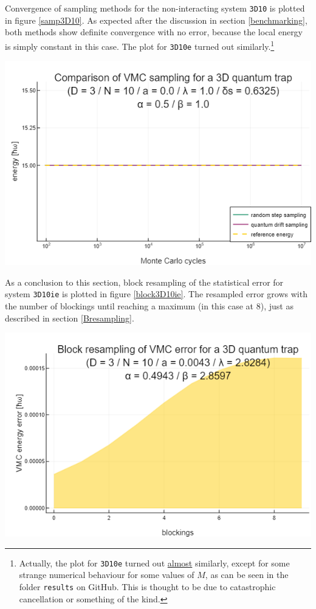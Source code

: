 \documentclass[a4paper,8pt]{article}
\begin{document}
\begin{multicols}{2}
Convergence of sampling methods for the non-interacting system \texttt{3D10} is plotted in figure \ref{samp3D10}. As expected after the discussion in section \ref{benchmarking}, both methods show definite convergence with no error, because the local energy is simply constant in this case. The plot for \texttt{3D10e} turned out similarly.\footnote{Actually, the plot for \texttt{3D10e} turned out \underline{almost} similarly, except for some strange numerical behaviour for some values of $M$, as can be seen in the folder \texttt{results} on GitHub. This is thought to be due to catastrophic cancellation or something of the kind.} 

\begin{center}
\includegraphics[width=0.9\columnwidth]{fig3D10_sampling}
\label{samp3D10}
\end{center}

As a conclusion to this section, block resampling of the statistical error for system \texttt{3D10ie} is plotted in figure \ref{block3D10ie}. The resampled error grows with the number of blockings until reaching a maximum (in this case at 8), just as described in section \ref{Bresampling}.

\begin{center}
\includegraphics[width=0.9\columnwidth]{fig3D10ie_resampling}
\label{block3D10ie}
\end{center}


\end{multicols}
\end{document}
